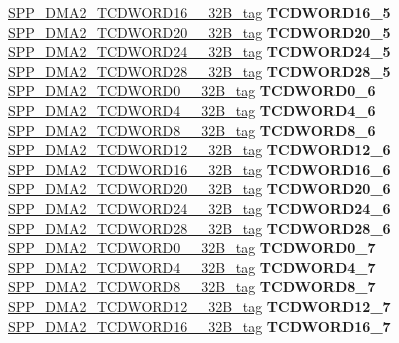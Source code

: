 \begin{DoxyCompactItemize}
\begin{tabbing}
\>\>\mbox{\hyperlink{unionSPP__DMA2__TCDWORD16____32B__tag}{SPP\_DMA2\_TCDWORD16\_\_32B\_tag}} {\bfseries TCDWORD16\_5}\\
\>\>\mbox{\hyperlink{unionSPP__DMA2__TCDWORD20____32B__tag}{SPP\_DMA2\_TCDWORD20\_\_32B\_tag}} {\bfseries TCDWORD20\_5}\\
\>\>\mbox{\hyperlink{unionSPP__DMA2__TCDWORD24____32B__tag}{SPP\_DMA2\_TCDWORD24\_\_32B\_tag}} {\bfseries TCDWORD24\_5}\\
\>\>\mbox{\hyperlink{unionSPP__DMA2__TCDWORD28____32B__tag}{SPP\_DMA2\_TCDWORD28\_\_32B\_tag}} {\bfseries TCDWORD28\_5}\\
\>\>\mbox{\hyperlink{unionSPP__DMA2__TCDWORD0____32B__tag}{SPP\_DMA2\_TCDWORD0\_\_32B\_tag}} {\bfseries TCDWORD0\_6}\\
\>\>\mbox{\hyperlink{unionSPP__DMA2__TCDWORD4____32B__tag}{SPP\_DMA2\_TCDWORD4\_\_32B\_tag}} {\bfseries TCDWORD4\_6}\\
\>\>\mbox{\hyperlink{unionSPP__DMA2__TCDWORD8____32B__tag}{SPP\_DMA2\_TCDWORD8\_\_32B\_tag}} {\bfseries TCDWORD8\_6}\\
\>\>\mbox{\hyperlink{unionSPP__DMA2__TCDWORD12____32B__tag}{SPP\_DMA2\_TCDWORD12\_\_32B\_tag}} {\bfseries TCDWORD12\_6}\\
\>\>\mbox{\hyperlink{unionSPP__DMA2__TCDWORD16____32B__tag}{SPP\_DMA2\_TCDWORD16\_\_32B\_tag}} {\bfseries TCDWORD16\_6}\\
\>\>\mbox{\hyperlink{unionSPP__DMA2__TCDWORD20____32B__tag}{SPP\_DMA2\_TCDWORD20\_\_32B\_tag}} {\bfseries TCDWORD20\_6}\\
\>\>\mbox{\hyperlink{unionSPP__DMA2__TCDWORD24____32B__tag}{SPP\_DMA2\_TCDWORD24\_\_32B\_tag}} {\bfseries TCDWORD24\_6}\\
\>\>\mbox{\hyperlink{unionSPP__DMA2__TCDWORD28____32B__tag}{SPP\_DMA2\_TCDWORD28\_\_32B\_tag}} {\bfseries TCDWORD28\_6}\\
\>\>\mbox{\hyperlink{unionSPP__DMA2__TCDWORD0____32B__tag}{SPP\_DMA2\_TCDWORD0\_\_32B\_tag}} {\bfseries TCDWORD0\_7}\\
\>\>\mbox{\hyperlink{unionSPP__DMA2__TCDWORD4____32B__tag}{SPP\_DMA2\_TCDWORD4\_\_32B\_tag}} {\bfseries TCDWORD4\_7}\\
\>\>\mbox{\hyperlink{unionSPP__DMA2__TCDWORD8____32B__tag}{SPP\_DMA2\_TCDWORD8\_\_32B\_tag}} {\bfseries TCDWORD8\_7}\\
\>\>\mbox{\hyperlink{unionSPP__DMA2__TCDWORD12____32B__tag}{SPP\_DMA2\_TCDWORD12\_\_32B\_tag}} {\bfseries TCDWORD12\_7}\\
\>\>\mbox{\hyperlink{unionSPP__DMA2__TCDWORD16____32B__tag}{SPP\_DMA2\_TCDWORD16\_\_32B\_tag}} {\bfseries TCDWORD16\_7}\\

\end{tabbing}
\end{DoxyCompactItemize}
